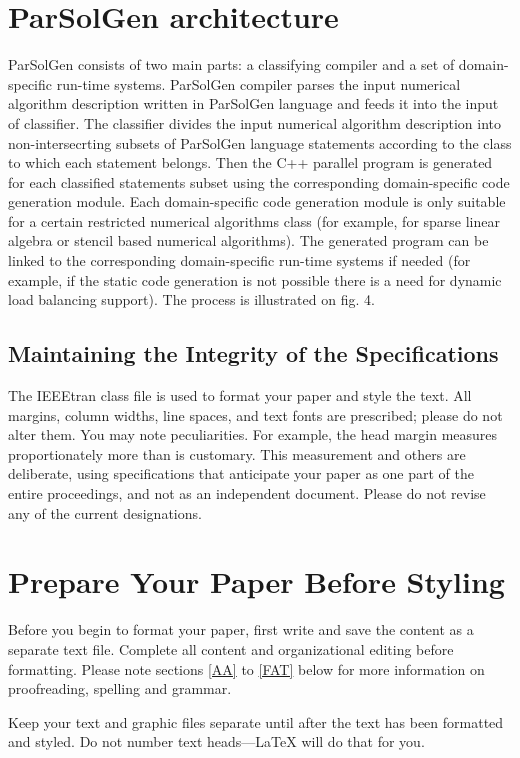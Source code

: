 \documentclass[conference]{IEEEtran}
\begin{document}
\section{ParSolGen architecture}
ParSolGen consists of two main parts: a classifying compiler and a set of domain-specific run-time systems. 
ParSolGen compiler parses the input numerical algorithm description written in ParSolGen language and feeds it into 
the input of classifier. The classifier divides the input numerical algorithm description into non-intersecrting 
subsets of ParSolGen language statements according to the class to which each statement belongs. Then 
the C++ parallel program is generated for each classified statements subset using the corresponding domain-specific 
code generation module. Each domain-specific code generation module is only suitable for a certain restricted 
numerical algorithms class (for example, for sparse linear algebra or stencil based numerical algorithms). 
The generated program can be 
linked to the corresponding domain-specific run-time systems if needed (for example, if the static code generation is not possible there is a need for dynamic load balancing support).
The process is illustrated on fig. 4.


\subsection{Maintaining the Integrity of the Specifications}

The IEEEtran class file is used to format your paper and style the text. All margins, 
column widths, line spaces, and text fonts are prescribed; please do not 
alter them. You may note peculiarities. For example, the head margin
measures proportionately more than is customary. This measurement 
and others are deliberate, using specifications that anticipate your paper 
as one part of the entire proceedings, and not as an independent document. 
Please do not revise any of the current designations.

\section{Prepare Your Paper Before Styling}
Before you begin to format your paper, first write and save the content as a 
separate text file. Complete all content and organizational editing before 
formatting. Please note sections \ref{AA} to \ref{FAT} below for more information on 
proofreading, spelling and grammar.

Keep your text and graphic files separate until after the text has been 
formatted and styled. Do not number text heads---{\LaTeX} will do that 
for you.
\end{document}
